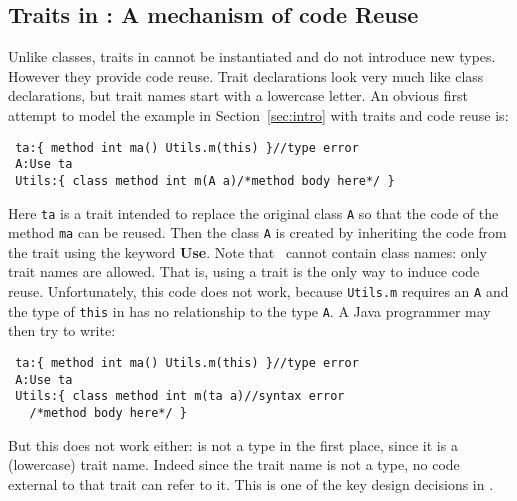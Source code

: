 \subsection{Traits in \name: A mechanism of code Reuse}

Unlike classes, traits in \name cannot be instantiated and do not introduce new
types. However they provide code reuse.
Trait declarations 
look very much like class declarations, but trait names 
start with a lowercase letter. An obvious first attempt 
to model the example in Section~\ref{sec:intro} 
with traits and code reuse is:
\saveSpace
\begin{lstlisting}
 ta:{ method int ma() Utils.m(this) }//type error
 A:Use ta
 Utils:{ class method int m(A a)/*method body here*/ }
\end{lstlisting}
\saveSpace
\noindent Here \lstinline{ta} is a trait intended to replace the
original class \lstinline{A} so that the code of the method
\lstinline{ma} can be reused. Then the class \lstinline{A} 
is created by inheriting the code from the trait using the keyword 
{\bf Use}. Note that \use\ cannot contain class names: only trait
names are allowed.
That is, using a trait is the only way to induce code reuse.
Unfortunately, this code does not work, 
because \lstinline{Utils.m} requires an \lstinline{A} and the type of \lstinline{this} in
\Q@ta@ has no relationship to the type \lstinline{A}.
A Java programmer may then try to write:
\saveSpace
\begin{lstlisting}
 ta:{ method int ma() Utils.m(this) }//type error
 A:Use ta
 Utils:{ class method int m(ta a)//syntax error
   /*method body here*/ }
\end{lstlisting}
\saveSpace
But this does not work either: \Q@ta@ is not a type in the first place, since it is a (lowercase) trait name.
Indeed
since the trait name is not a type, no code external to that trait can
refer to it. This is one of the key design decisions in \name. 



